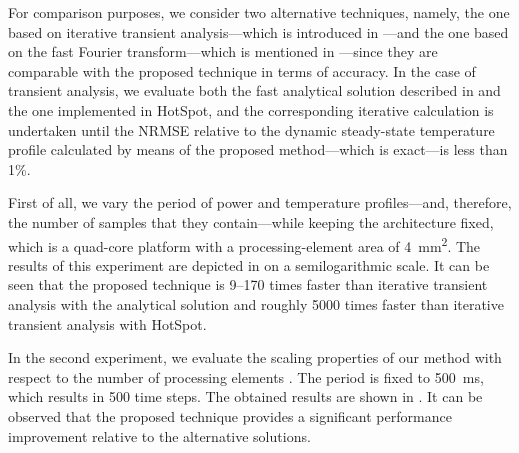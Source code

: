 For comparison purposes, we consider two alternative techniques, namely, the one
based on iterative transient analysis---which is introduced in
---and the one based on the fast Fourier
transform---which is mentioned in ---since
they are comparable with the proposed technique in terms of accuracy. In the
case of transient analysis, we evaluate both the fast analytical solution
described in  and the one implemented in HotSpot, and
the corresponding iterative calculation is undertaken until the \ac{NRMSE}
relative to the dynamic steady-state temperature profile calculated by means of
the proposed method---which is exact---is less than 1\%.

First of all, we vary the period \period of power and temperature
profiles---and, therefore, the number of samples \ns that they contain---while
keeping the architecture fixed, which is a quad-core platform with a
processing-element area of 4~mm\textsuperscript{2}. The results of this
experiment are depicted in  on a
semilogarithmic scale. It can be seen that the proposed technique is 9--170
times faster than iterative transient analysis with the analytical solution and
roughly 5000 times faster than iterative transient analysis with HotSpot.

In the second experiment, we evaluate the scaling properties of our method with
respect to the number of processing elements \np. The period is fixed to 500~ms,
which results in 500 time steps. The obtained results are shown in
. It can be observed that the
proposed technique provides a significant performance improvement relative to
the alternative solutions.
